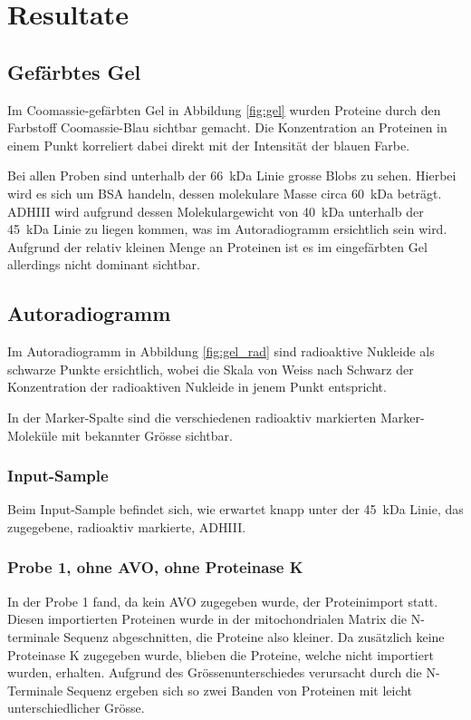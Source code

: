 \documentclass[a4paper,german]{scrreprt}
\begin{document}
\chapter{Resultate}

\section{Gefärbtes Gel}

Im Coomassie-gefärbten Gel in Abbildung \ref{fig:gel} wurden Proteine durch den
Farbstoff Coomassie-Blau sichtbar gemacht. Die Konzentration an Proteinen in
einem Punkt korreliert dabei direkt mit der Intensität der blauen Farbe.

Bei allen Proben sind unterhalb der \SI{66}{\kilo\dalton} Linie grosse Blobs zu
sehen. Hierbei wird es sich um BSA handeln, dessen molekulare Masse circa
\SI{60}{\kilo\dalton} beträgt. ADHIII wird aufgrund dessen Molekulargewicht von
\SI{40}{\kilo\dalton} unterhalb der \SI{45}{\kilo\dalton} Linie zu liegen
kommen, was im Autoradiogramm ersichtlich sein wird. Aufgrund der relativ
kleinen Menge an
Proteinen ist es im eingefärbten Gel allerdings nicht dominant sichtbar.

\section{Autoradiogramm}

Im Autoradiogramm in Abbildung \ref{fig:gel_rad} sind radioaktive Nukleide als
schwarze Punkte ersichtlich, wobei die Skala von Weiss nach Schwarz der
Konzentration der radioaktiven Nukleide in jenem Punkt entspricht.

In der Marker-Spalte sind die verschiedenen radioaktiv markierten
Marker-Moleküle mit bekannter Grösse sichtbar.

\subsection{Input-Sample}

Beim Input-Sample befindet sich, wie erwartet knapp unter der
\SI{45}{\kilo\dalton} Linie, das zugegebene, radioaktiv markierte, ADHIII.

\subsection{Probe 1, ohne AVO, ohne Proteinase K}

In der Probe 1 fand, da kein AVO zugegeben wurde, der Proteinimport statt.
Diesen importierten Proteinen wurde in der mitochondrialen Matrix die
N-terminale Sequenz abgeschnitten, die Proteine also kleiner. Da zusätzlich
keine Proteinase K zugegeben wurde, blieben die Proteine, welche nicht
importiert wurden, erhalten. Aufgrund des Grössenunterschiedes verursacht durch
die N-Terminale Sequenz ergeben sich so zwei Banden von Proteinen mit leicht
unterschiedlicher Grösse.
\end{document}

